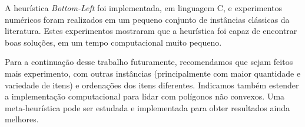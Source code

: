 \documentclass{article}
\begin{document}
A heurística {\it Bottom-Left} foi implementada, em linguagem C, e experimentos numéricos foram realizados em um pequeno conjunto de instâncias clássicas da literatura. Estes experimentos mostraram que a heurística foi capaz de encontrar boas soluções, em um tempo computacional muito pequeno.

Para a continuação desse trabalho futuramente, recomendamos que sejam feitos mais experimento, com outras instâncias (principalmente com maior quantidade e variedade de itens) e ordenações dos itens diferentes. Indicamos também estender a implementação computacional para lidar com polígonos não convexos. Uma meta-heurística pode ser estudada e implementada para obter resultados ainda melhores.



\clearpage


% 
\printbibliography
\end{document}
